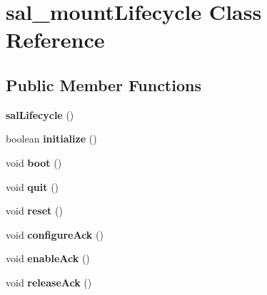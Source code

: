 \hypertarget{classsal__mount_lifecycle}{\section{sal\-\_\-mount\-Lifecycle Class Reference}
\label{classsal__mount_lifecycle}
}
\subsection*{Public Member Functions}
\begin{DoxyCompactItemize}
\item 
\hypertarget{classsal__mount_lifecycle_a6f369e34031eda7481950a31eba830eb}{{\bfseries sal\-Lifecycle} ()}\label{classsal__mount_lifecycle_a6f369e34031eda7481950a31eba830eb}

\item 
\hypertarget{classsal__mount_lifecycle_a8e7152018dfdcca68fc7c447ab0ef185}{boolean {\bfseries initialize} ()}\label{classsal__mount_lifecycle_a8e7152018dfdcca68fc7c447ab0ef185}

\item 
\hypertarget{classsal__mount_lifecycle_aa86f3d0f69feeea27617e852172c5554}{void {\bfseries boot} ()}\label{classsal__mount_lifecycle_aa86f3d0f69feeea27617e852172c5554}

\item 
\hypertarget{classsal__mount_lifecycle_a7e4440d52b76db712965d1735ed0dd45}{void {\bfseries quit} ()}\label{classsal__mount_lifecycle_a7e4440d52b76db712965d1735ed0dd45}

\item 
\hypertarget{classsal__mount_lifecycle_a0974d8a8e38c22fa84bf759923626d89}{void {\bfseries reset} ()}\label{classsal__mount_lifecycle_a0974d8a8e38c22fa84bf759923626d89}

\item 
\hypertarget{classsal__mount_lifecycle_a46964faa215934031574dc89deddfd01}{void {\bfseries configure\-Ack} ()}\label{classsal__mount_lifecycle_a46964faa215934031574dc89deddfd01}

\item 
\hypertarget{classsal__mount_lifecycle_a8fbe146934254b9aec00a390fcb15339}{void {\bfseries enable\-Ack} ()}\label{classsal__mount_lifecycle_a8fbe146934254b9aec00a390fcb15339}

\item 
\hypertarget{classsal__mount_lifecycle_ac2c322a33f4ff4c15ded52444873e57c}{void {\bfseries release\-Ack} ()}\label{classsal__mount_lifecycle_ac2c322a33f4ff4c15ded52444873e57c}


\end{DoxyCompactItemize}
